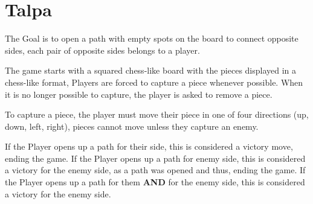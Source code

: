 \section{Talpa}
\noindent The Goal is to open a path with empty spots on the board to connect opposite sides,
each pair of opposite sides belongs to a player.

\noindent The game starts with a squared chess-like board with the pieces displayed in a chess-like format,
Players are forced to capture a piece whenever possible.
When it is no longer possible to capture, the player is asked to remove a piece.

\noindent To capture a piece, the player must move their piece in one of four directions (up, down, left, right),
pieces cannot move unless they capture an enemy.

\noindent If the Player opens up a path for their side, this is considered a victory move, ending the game.
If the Player opens up a path for enemy side, this is considered a victory for the enemy side, as a path
was opened and thus, ending the game.
If the Player opens up a path for them \textbf{AND} for the enemy side, this is considered a victory for the enemy side.